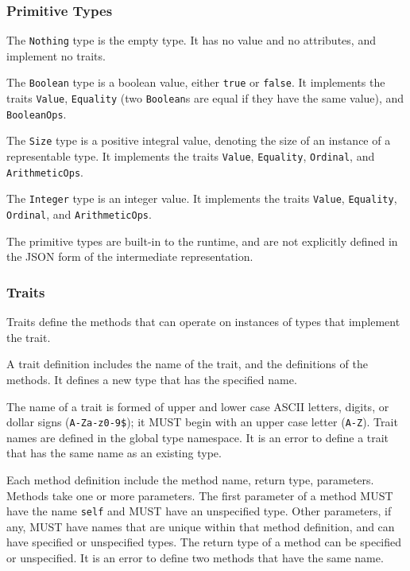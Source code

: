 \documentclass[10pt,twocolumn,a4paper]{article}
\newcommand{\code}[1]{\texttt{#1}}
\begin{document}
\subsubsection{Primitive Types}
\label{sec:primitives}

The \code{Nothing} type is the empty type. It has no value and no attributes,
and implement no traits.

The \code{Boolean} type is a boolean value, either \code{true} or \code{false}.
It implements the traits \code{Value}, \code{Equality} (two \code{Boolean}s are equal if
they have the same value), and \code{BooleanOps}.

The \code{Size} type is a positive integral value, denoting the size of an
instance of a representable type. It implements the traits \code{Value},
\code{Equality}, \code{Ordinal}, and \code{ArithmeticOps}.

The \code{Integer} type is an integer value. It implements the traits \code{Value},
\code{Equality}, \code{Ordinal}, and \code{ArithmeticOps}.

The primitive types are built-in to the runtime, and are not explicitly
defined in the JSON form of the intermediate representation.

\subsubsection{Traits}
\label{sec:traits}

Traits define the methods that can operate on instances of types that
implement the trait.

A trait definition includes the name of the trait, and the definitions
of the methods. It defines a new type that has the specified name.

The name of a trait is formed of upper and lower case ASCII letters,
digits, or dollar signs (\code{A-Za-z0-9\$}); it MUST begin with an
upper case letter (\code{A-Z}). Trait names are defined in the global type
namespace.  It is an error to define a trait that has the same name as an
existing type.

Each method definition include the method name, return type, parameters.
Methods take one or more parameters.
The first parameter of a method MUST have the name \code{self} and MUST
have an unspecified type.
Other parameters, if any, MUST have names that are unique within that
method definition, and can have specified or unspecified types.
The return type of a method can be specified or unspecified.  
It is an error to define two methods that have the same name.
\end{document}
